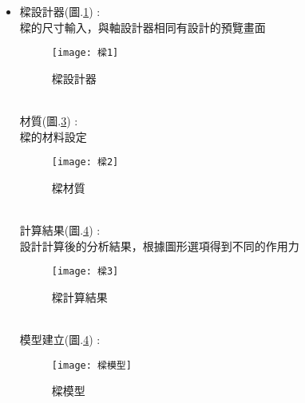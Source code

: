 \begin{itemize}
	\item 樑設計器(圖.\ref{2.71}) :\\
		\qquad 樑的尺寸輸入，與軸設計器相同有設計的預覽畫面\\
		\begin{figure}[hbt!]
		\begin{center}
		\texttt{[image: 樑1]}
		\caption{\Large 樑設計器}\label{2.71}
		\end{center}
		\end{figure}
		\\
		材質(圖.\ref{2.72}) :\\
		\qquad 樑的材料設定\\
		\begin{figure}[hbt!]
		\begin{center}
		\texttt{[image: 樑2]}
		\caption{\Large 樑材質}\label{2.72}
		\end{center}
		\end{figure}
		\\
		計算結果(圖.\ref{2.73}) :\\
		\qquad 設計計算後的分析結果，根據圖形選項得到不同的作用力\\
		\begin{figure}[hbt!]
		\begin{center}
		\texttt{[image: 樑3]}
		\caption{\Large 樑計算結果}\label{2.72}
		\end{center}
		\end{figure}
		\\
		模型建立(圖.\ref{2.73}) :\\
		\begin{figure}[hbt!]
		\begin{center}
		\texttt{[image: 樑模型]}
		\caption{\Large 樑模型}\label{2.73}
		\end{center}
		\end{figure}
		\\
		

\end{itemize}
